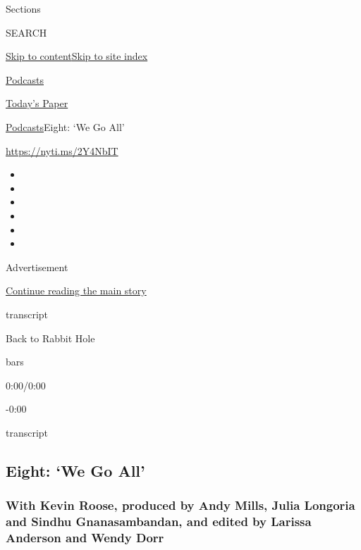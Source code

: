 Sections

SEARCH

\protect\hyperlink{site-content}{Skip to
content}\protect\hyperlink{site-index}{Skip to site index}

\href{https://www.nytimes3xbfgragh.onion/spotlight/podcasts}{Podcasts}

\href{https://myaccount.nytimes3xbfgragh.onion/auth/login?response_type=cookie\&client_id=vi}{}

\href{https://www.nytimes3xbfgragh.onion/section/todayspaper}{Today's
Paper}

\href{/spotlight/podcasts}{Podcasts}\textbar{}Eight: `We Go All'

\href{https://nyti.ms/2Y4NbIT}{https://nyti.ms/2Y4NbIT}

\begin{itemize}
\item
\item
\item
\item
\item
\item
\end{itemize}

Advertisement

\protect\hyperlink{after-top}{Continue reading the main story}

transcript

Back to Rabbit Hole

bars

0:00/0:00

-0:00

transcript

\hypertarget{eight-we-go-all}{%
\subsection{Eight: `We Go All'}\label{eight-we-go-all}}

\hypertarget{with-kevin-roose-produced-by-andy-mills-julia-longoria-and-sindhu-gnanasambandan-and-edited-by-larissa-anderson-and-wendy-dorr}{%
\subsubsection{With Kevin Roose, produced by Andy Mills, Julia Longoria
and Sindhu Gnanasambandan, and edited by Larissa Anderson and Wendy
Dorr}\label{with-kevin-roose-produced-by-andy-mills-julia-longoria-and-sindhu-gnanasambandan-and-edited-by-larissa-anderson-and-wendy-dorr}}

